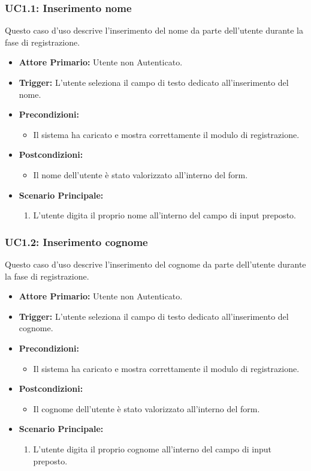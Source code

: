 \documentclass[12pt, a4paper]{article}
\begin{document}
\subsubsection{UC1.1: Inserimento nome}\label{uc:1.1}
Questo caso d'uso descrive l'inserimento del nome da parte dell'utente durante la fase di registrazione.
\begin{itemize}
    \item \textbf{Attore Primario:} Utente non Autenticato.
    \item \textbf{Trigger:} L'utente seleziona il campo di testo dedicato all'inserimento del nome.
    \item \textbf{Precondizioni:} \begin{itemize}\item Il sistema ha caricato e mostra correttamente il modulo di registrazione.\end{itemize}
    \item \textbf{Postcondizioni:} \begin{itemize}\item Il nome dell'utente è stato valorizzato all'interno del form.\end{itemize}
    \item \textbf{Scenario Principale:}
    \begin{enumerate}
        \item L'utente digita il proprio nome all'interno del campo di input preposto.
    \end{enumerate}
\end{itemize}

\subsubsection{UC1.2: Inserimento cognome}\label{uc:1.2}
Questo caso d'uso descrive l'inserimento del cognome da parte dell'utente durante la fase di registrazione.
\begin{itemize}
    \item \textbf{Attore Primario:} Utente non Autenticato.
    \item \textbf{Trigger:} L'utente seleziona il campo di testo dedicato all'inserimento del cognome.
    \item \textbf{Precondizioni:}\begin{itemize}\item Il sistema ha caricato e mostra correttamente il modulo di registrazione.\end{itemize}
    \item \textbf{Postcondizioni:}\begin{itemize}\item Il cognome dell'utente è stato valorizzato all'interno del form.\end{itemize}
    \item \textbf{Scenario Principale:}
    \begin{enumerate}
        \item L'utente digita il proprio cognome all'interno del campo di input preposto.
    \end{enumerate}
\end{itemize}
\end{document}
